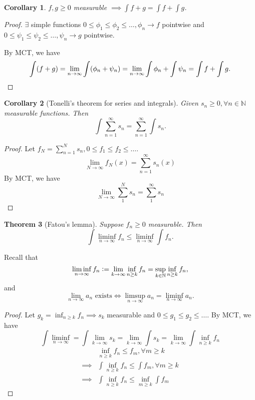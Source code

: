 \documentclass{report}
\newcommand{\N}{\mathbb{N}}
\newcommand{\defeq}{\vcentcolon=}
\newtheorem{theorem}{Theorem}[chapter]
\newtheorem{corollary}[theorem]{Corollary}
\theoremstyle{definition}
\theoremstyle{remark}
\begin{document}
\begin{corollary}
	$f, g \geq 0$ measurable $\displaystyle \implies \int f + g = \int f + \int g$. 
\end{corollary}
\begin{proof}
	$\exists$ simple functions $0 \leq \phi_1 \leq \phi_2 \leq \ldots, \phi_n \to f$ pointwise and $0 \leq \psi_1 \leq \psi_2 \leq \ldots, \psi_n \to g$ pointwise.

	By MCT, we have
	\[
	 	\int (f + g) =  \lim_{n \to \infty} \int (\phi_n + \psi_n) = \lim_{n \to \infty} \int \phi_n + \int \psi_n = \int f + \int g. \qedhere
	\]
\end{proof}

\begin{corollary}[Tonelli's theorem for series and integrals]
	Given $s_n \geq 0, \forall n \in \N$ measurable functions.
	Then
	\[
		\int \sum_{n=1}^\infty	s_n = \sum_{n=1}^\infty \int s_n.
	\]
\end{corollary}
\begin{proof}
	Let $f_N = \sum_{n=1}^N s_n, 0 \leq f_1 \leq f_2 \leq \ldots$.
	\[
		\lim_{N \to \infty}f_N(x) = \sum_{n=1}^\infty s_n(x)\]
	By MCT, we have \[
		\lim_{N \to \infty} \sum_1^N s_n = \sum_1^\infty s_n	
	\]
\end{proof}
\begin{theorem}[Fatou's lemma]
	Suppose $f_n \geq 0$ measurable. Then \[\int \liminf_{n \to \infty} f_n \leq \liminf_{n \to \infty}\int f_n.\]
\end{theorem}
Recall that \[
\liminf_{n \to \infty} f_n \defeq \lim_{k \to \infty} \inf_{n \geq k} f_n = \sup_{k \in \N} \inf_{n \geq k} f_n,
\]
and
\[
\lim_{n \to \infty} a_n \text{ exists} \iff \limsup_{n \to \infty} a_n = \liminf_{n \to \infty} a_n.
\]
\begin{proof}
	Let $g_k = \inf_{n \geq k} f_n \implies s_k$ measurable and $0 \leq g_1 \leq g_2 \leq \ldots$. By MCT, we have \[
		\int \liminf_{n \to \infty} = \int\lim_{k \to \infty} s_k = \lim_{k \to \infty} \int s_k = \lim_{k \to \infty} \int \inf_{n \geq k} f_n
	\]
	\begin{align*}
		& \inf_{n \geq k} f_n \leq f_m, \forall m \geq k \\
		\implies & \int \inf_{n \geq k}f_n \leq \int f_m, \forall m \geq k \\
		\implies & \int \inf_{n \geq k}f_n \leq \inf_{m \geq k}\int f_m
	\end{align*}

\end{proof}
\end{document}
